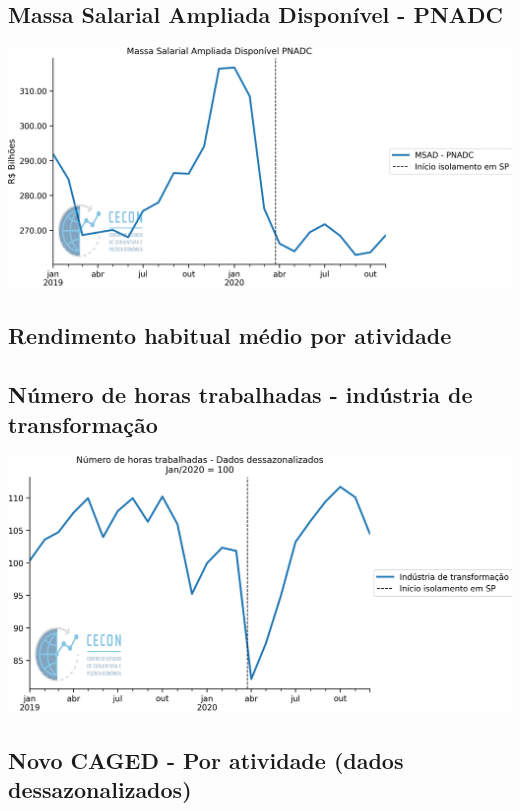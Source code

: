\documentclass{SelfArx}
\begin{document}
\subsection*{Massa Salarial Ampliada Disponível - PNADC}
\label{sec:org38c527c}

\begin{center}
\includegraphics[width=.9\linewidth]{./figs/Emprego/MSAD.png}
\end{center}

\subsection*{Rendimento habitual médio por atividade}
\label{sec:orgc31d960}

\subsection*{Número de horas trabalhadas - indústria de transformação}
\label{sec:org1fa353f}

\begin{center}
\includegraphics[width=.9\linewidth]{./figs/Emprego/Horas_Transformacao.png}
\end{center}

\subsection*{Novo CAGED  - Por atividade (dados dessazonalizados)}
\label{sec:org2b38c4d}
\end{document}
